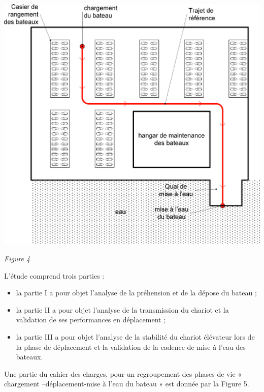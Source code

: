 \documentclass[10pt,fleqn]{article} %
\begin{document}
\begin{center}
\includegraphics[width=.8\linewidth]{images/fig_04}

\textit{Figure 4}
\end{center}



L’étude comprend trois parties :
\begin{itemize}
\item la partie I a pour objet l’analyse de la préhension et de la dépose du bateau ;
\item la partie II a pour objet l’analyse de la transmission du chariot et la validation de ses performances en déplacement ;
\item la partie III a pour objet l’analyse de la stabilité du chariot élévateur lors de la phase de déplacement et la validation de la cadence de mise à l’eau des bateaux.
\end{itemize}

Une partie du cahier des charges, pour un regroupement des phases de vie « chargement --déplacement-mise à l’eau du bateau » est donnée par la Figure 5.
\end{document}
